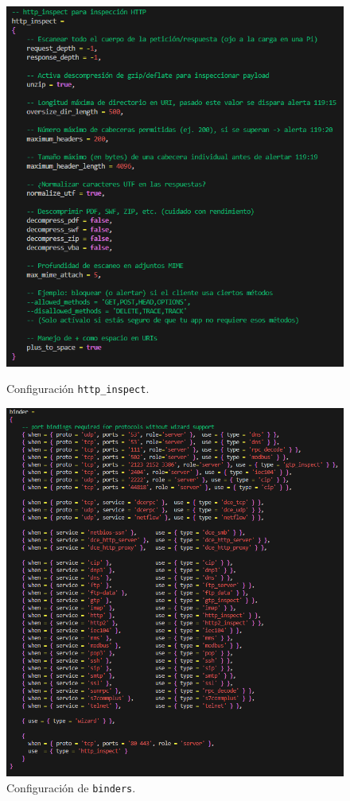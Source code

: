 \documentclass[12pt,a4paper]{report}
\begin{document}
\begin{figure}[H]
	\centering
	\begin{minipage}[b]{0.45\textwidth}
		\centering
		\includegraphics[scale=0.4]{http_inspect/4.png}
		\caption{Configuración \texttt{http\_inspect}.}
	\end{minipage}
	\hfill
	\begin{minipage}[b]{0.45\textwidth}
		\centering
		\includegraphics[scale=0.35]{http_inspect/5.png}
		\caption{Configuración de \texttt{binders}.}
	\end{minipage}
\end{figure}
\end{document}
